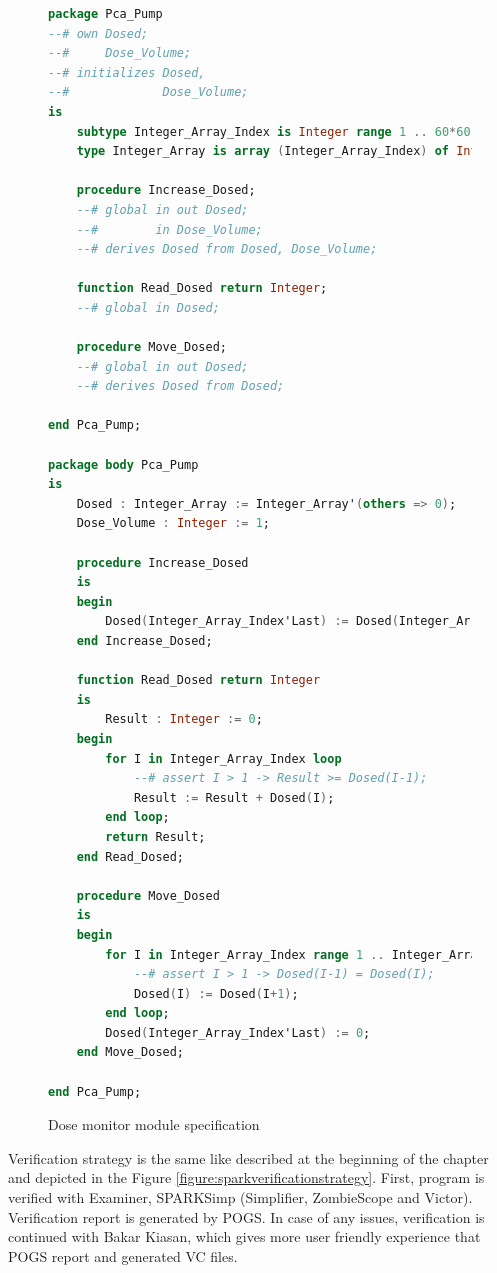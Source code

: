 \begin{figure}
\singlespacing
\begin{lstlisting}[language=ada, frame=single, gobble=0]
package Pca_Pump
--# own Dosed;
--#     Dose_Volume;
--# initializes Dosed,
--#             Dose_Volume;
is
    subtype Integer_Array_Index is Integer range 1 .. 60*60;
    type Integer_Array is array (Integer_Array_Index) of Integer;

    procedure Increase_Dosed;
    --# global in out Dosed;
    --#        in Dose_Volume;
    --# derives Dosed from Dosed, Dose_Volume;

    function Read_Dosed return Integer;
    --# global in Dosed;

    procedure Move_Dosed;
    --# global in out Dosed;
    --# derives Dosed from Dosed;

end Pca_Pump;

package body Pca_Pump
is
    Dosed : Integer_Array := Integer_Array'(others => 0);
    Dose_Volume : Integer := 1;

    procedure Increase_Dosed
    is
    begin
        Dosed(Integer_Array_Index'Last) := Dosed(Integer_Array_Index'Last) + Dose_Volume;
    end Increase_Dosed;

    function Read_Dosed return Integer
    is
        Result : Integer := 0;
    begin
        for I in Integer_Array_Index loop
            --# assert I > 1 -> Result >= Dosed(I-1);
            Result := Result + Dosed(I);
        end loop;
        return Result;
    end Read_Dosed;

    procedure Move_Dosed
    is
    begin
        for I in Integer_Array_Index range 1 .. Integer_Array_Index'Last-1 loop
            --# assert I > 1 -> Dosed(I-1) = Dosed(I);
            Dosed(I) := Dosed(I+1);
        end loop;
        Dosed(Integer_Array_Index'Last) := 0;
    end Move_Dosed;

end Pca_Pump;
\end{lstlisting}
\doublespacing
\caption{Dose monitor module specification}
\label{listing:pcapump_dosemonitor}
\end{figure}

Verification strategy is the same like described at the beginning of the chapter and depicted in the Figure \ref{figure:sparkverificationstrategy}. First, program is verified with Examiner, SPARKSimp (Simplifier, ZombieScope and Victor). Verification report is generated by POGS. In case of any issues, verification is continued with Bakar Kiasan, which gives more user friendly experience that POGS report and generated VC files. 

